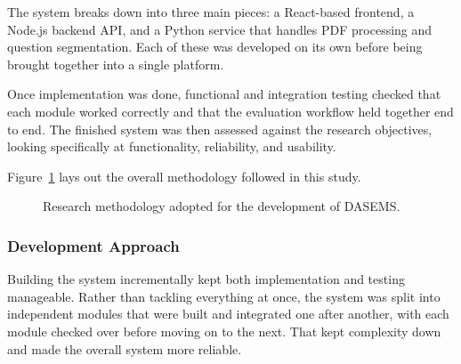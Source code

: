 The system breaks down into three main pieces: a React-based frontend, a Node.js backend API, and a Python service that handles PDF processing and question segmentation. Each of these was developed on its own before being brought together into a single platform.

Once implementation was done, functional and integration testing checked that each module worked correctly and that the evaluation workflow held together end to end. The finished system was then assessed against the research objectives, looking specifically at functionality, reliability, and usability.

Figure~\ref{fig:research_methodology} lays out the overall methodology followed in this study.

\begin{figure}[ht]
\centering


\caption{Research methodology adopted for the development of DASEMS.}
\label{fig:research_methodology}

\end{figure}

\subsubsection{Development Approach}

Building the system incrementally kept both implementation and testing manageable. Rather than tackling everything at once, the system was split into independent modules that were built and integrated one after another, with each module checked over before moving on to the next. That kept complexity down and made the overall system more reliable.

